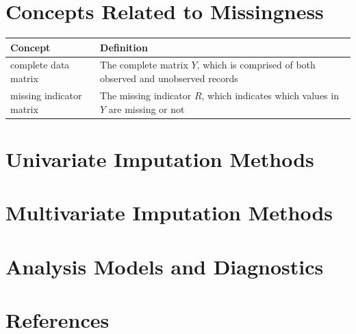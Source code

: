 \documentclass[12pt,oneside]{chicagocapstone}
\begin{document}
\chapter{Concepts Related to
Missingness}\label{concepts-related-to-missingness}
\begin{longtable}[]{@{}ll@{}}
\toprule
\begin{minipage}[b]{0.25\columnwidth}\raggedright\strut
Concept\strut
\end{minipage} & \begin{minipage}[b]{0.69\columnwidth}\raggedright\strut
Definition\strut
\end{minipage}\tabularnewline
\midrule
\endhead
\begin{minipage}[t]{0.25\columnwidth}\raggedright\strut
complete data matrix\strut
\end{minipage} & \begin{minipage}[t]{0.69\columnwidth}\raggedright\strut
The complete matrix \(Y\), which is comprised of both observed and
unobserved records\strut
\end{minipage}\tabularnewline
\begin{minipage}[t]{0.25\columnwidth}\raggedright\strut
missing indicator matrix\strut
\end{minipage} & \begin{minipage}[t]{0.69\columnwidth}\raggedright\strut
The missing indicator \(R\), which indicates which values in \(Y\) are
missing or not\strut
\end{minipage}\tabularnewline
\bottomrule
\end{longtable}
\chapter{Univariate Imputation
Methods}\label{univariate-imputation-methods}

\chapter{Multivariate Imputation
Methods}\label{multivariate-imputation-methods}

\chapter{Analysis Models and
Diagnostics}\label{analysis-models-and-diagnostics}

\backmatter

\chapter*{References}\label{references}
\end{document}
